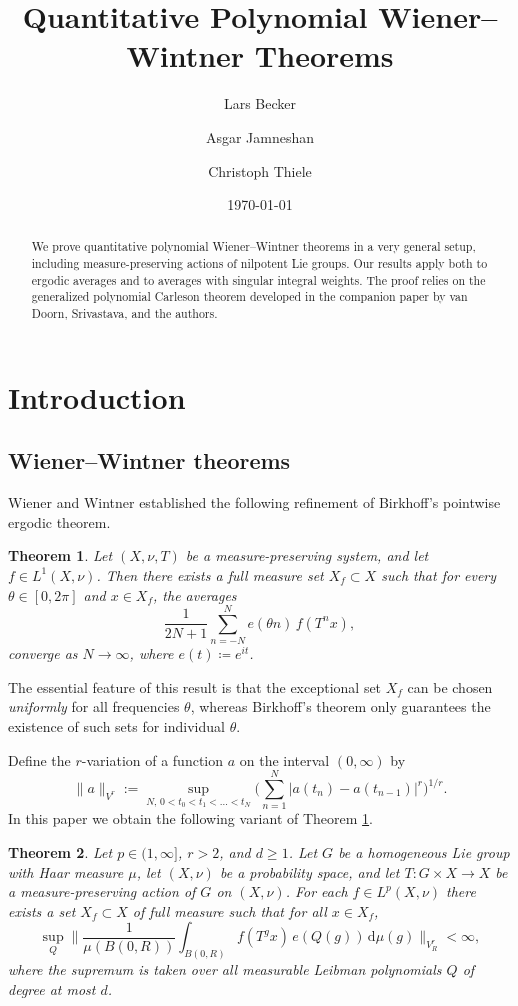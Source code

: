 \documentclass[12pt,reqno,a4paper,dvipsnames]{amsart}
\title[Polynomial Wiener--Wintner]{Quantitative Polynomial Wiener--Wintner Theorems}
\author[Becker]{Lars Becker}
\author[Jamneshan]{Asgar Jamneshan}
\author[Thiele]{Christoph Thiele}
\date{\today}
\theoremstyle{plain}
\newtheorem{theorem}{Theorem}
\theoremstyle{definition}
\numberwithin{theorem}{section}
\numberwithin{equation}{section}
\begin{document}
\begin{abstract}
We prove quantitative polynomial Wiener--Wintner theorems in a very general setup, including measure-preserving actions of nilpotent Lie groups. Our results apply both to ergodic averages and to averages with singular integral weights. The proof relies on the generalized polynomial Carleson theorem developed in the companion paper by van Doorn, Srivastava, and the authors. 
\end{abstract}

\maketitle

\section{Introduction}
\subsection{Wiener--Wintner theorems}
Wiener and Wintner \cite{wiener-wintner} established the following refinement of Birkhoff's pointwise ergodic theorem. 

\begin{theorem}
\label{t:wiener-wintner}
    Let $(X,\nu,T)$ be a measure-preserving system, and let $f \in L^1(X,\nu)$. Then there exists a full measure set $X_f \subset X$ such that for every $\theta \in [0,2\pi]$ and $x \in X_f$, the averages
    \[
        \frac{1}{2N+1}\sum_{n=-N}^N e(\theta n)\, f(T^n x),
    \]
    converge as $N \to \infty$, where $e(t) \coloneqq e^{it}$. 
\end{theorem}

The essential feature of this result is that the exceptional set $X_f$ can be chosen \emph{uniformly} for all frequencies $\theta$, whereas Birkhoff's theorem only guarantees the existence of such sets for individual $\theta$. 

Define the $r$-variation of a function $a$ on the interval $(0,\infty)$ by
\[
    \|a\|_{V^r}
    := \sup_{N,\, 0 <t_0 < t_1 < \dots < t_N}
    \Big( \sum_{n=1}^N |a(t_n) - a(t_{n-1})|^r \Big)^{1/r}.
\]
In this paper we obtain the following variant of Theorem \ref{t:wiener-wintner}.

\begin{theorem}\label{t:main}
    Let $p\in(1,\infty]$, $r > 2$, and $d \ge 1$. Let $G$ be a homogeneous Lie group with Haar measure $\mu$, let $(X,\nu)$ be a probability space, and let $T \colon G \times X \to X$
    be a measure-preserving action of $G$ on $(X,\nu)$. For each $f \in L^p(X, \nu)$ there exists a set $X_f \subset X$ of full measure such that for all $x \in X_f$, 
    \begin{equation*}
        \sup_{Q} \Big\|\frac{1}{\mu(B(0,R))} \int_{B(0,R)} 
        f(T^g x)\, e(Q(g))\, \mathrm{d}\mu(g)\Big\|_{V^r_R} < \infty,
    \end{equation*}
     where the supremum is taken over all measurable Leibman polynomials $Q$ of degree at most $d$. 
\end{theorem}
\end{document}
